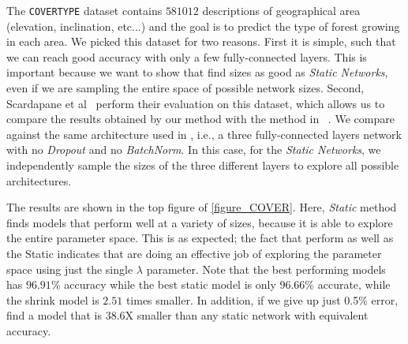 The \texttt{COVERTYPE} \cite{Blackard:1998:CNN:928509} dataset contains $581012$
descriptions of geographical area (elevation, inclination, etc...) and the goal
is to predict the type of forest growing in each area. We picked this dataset
for two reasons. First it is simple, such that we can reach good accuracy with
only a few fully-connected layers. This is important because we want to show
that \shrink find sizes as good as \textit{Static Networks}, even if
we are sampling the entire space of possible network sizes. Second, Scardapane
et al~\cite{Scardapane2017} perform their evaluation on this dataset, which
allows us to compare the results obtained by our method with the method in
~\cite{Scardapane2017}. We compare \shrink against the same architecture
used in \cite{Scardapane2017}, i.e., a three fully-connected layers network with no
\textit{Dropout} \cite{Srivastava2014} and no \textit{BatchNorm}. 
In this case, for the \textit{Static Networks}, we independently sample the
sizes of the three different layers to explore all possible architectures. 

The results are shown in the top figure of \cref{figure_COVER}.  Here, {\it Static}
method finds models that perform well at a variety of sizes, because it is able
to explore the entire parameter space.  This is as expected;  the fact that
\shrink perform as well as the Static indicates that \shrink are doing an
effective job of exploring the parameter space using just the single $\lambda$
parameter.  Note that the best performing \shrink models has $96.91\%$ accuracy
while the best static model is only $96.66\%$ accurate, while the \shrink shrink
model is $2.51$ times smaller. In addition, if we give up just 0.5\% error,
\shrink find a model that is 38.6X smaller than any static network with
equivalent accuracy.


% 


